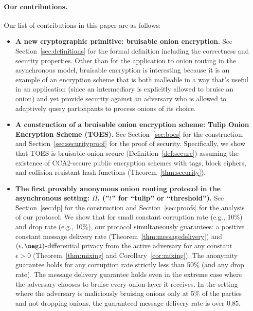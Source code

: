 \documentclass[runningheads,a4paper]{llncs}
\begin{document}
\paragraph{Our contributions.} Our list of contributions in this paper are as follows: 
\begin{itemize}
    \item \textbf{A new cryptographic primitive: bruisable onion encryption.} See Section~\ref{sec:definitions} for the formal definition including the correctness and security properties.  Other than for the application to onion routing in the asynchronous model, bruisable encryption is interesting because it is an example of an encryption scheme that is both malleable in a way that's useful in an application (since an intermediary is explicitly allowed to bruise an onion) and yet provide security against an adversary who is allowed to adaptively query participants to process onions of its choice.
    \item \textbf{A construction of a bruisable onion encryption scheme: Tulip Onion Encryption Scheme (TOES).} See Section~\ref{sec:boes} for the construction, and Section~\ref{sec:securityproof} for the proof of security. Specifically, we show that TOES is bruisable-onion secure (Definition~\ref{def:secure}) assuming the existence of CCA2-secure public encryption schemes with tags, block ciphers, and collision-resistant hash functions (Theorem~\ref{thm:security}). %
    \item \textbf{The first provably anonymous onion routing protocol in the asynchronous setting: $\Pi_t$ (''$t$'' for ``tulip'' or ``threshold'').} See Section~\ref{sec:dp} for the construction and Section~\ref{sec:proofs} for the analysis of our protocol. We show that for small constant corruption rate (e.g., 10\%) and drop rate (e.g., 10\%), our protocol simultaneously guarantees: 
    a positive constant message delivery rate (Theorem~\ref{thm:messagedelivery}) and
    $(\epsilon, \negl)$-differential privacy from the active adversary for any constant $\epsilon > 0$ (Theorem~\ref{thm:mixing} and Corollary~\ref{cor:mixing}). The anonymity guarantee holds for any corruption rate strictly less than 50\% (and any drop rate). The message delivery guarantee holds even in the extreme case where the adversary chooses to bruise every onion layer it receives. In the setting where the adversary is maliciously bruising onions only at 5\% of the parties and not dropping onions, the guaranteed message delivery rate is over $0.85$.   %
\end{itemize}
\end{document}
